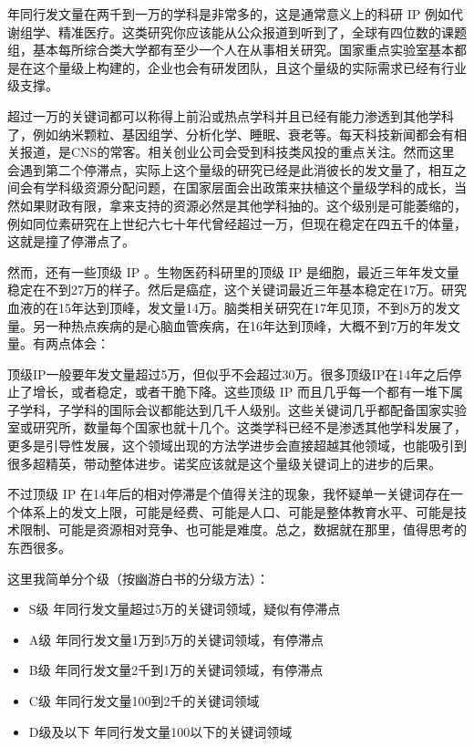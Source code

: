 \documentclass[]{book}
\begin{document}
年同行发文量在两千到一万的学科是非常多的，这是通常意义上的科研 IP 例如代谢组学、精准医疗。这类研究你应该能从公众报道到听到了，全球有四位数的课题组，基本每所综合类大学都有至少一个人在从事相关研究。国家重点实验室基本都是在这个量级上构建的，企业也会有研发团队，且这个量级的实际需求已经有行业级支撑。

超过一万的关键词都可以称得上前沿或热点学科并且已经有能力渗透到其他学科了，例如纳米颗粒、基因组学、分析化学、睡眠、衰老等。每天科技新闻都会有相关报道，是CNS的常客。相关创业公司会受到科技类风投的重点关注。然而这里会遇到第二个停滞点，实际上这个量级的研究已经是此消彼长的发文量了，相互之间会有学科级资源分配问题，在国家层面会出政策来扶植这个量级学科的成长，当然如果财政有限，拿来支持的资源必然是其他学科抽的。这个级别是可能萎缩的，例如同位素研究在上世纪六七十年代曾经超过一万，但现在稳定在四五千的体量，这就是撞了停滞点了。

然而，还有一些顶级 IP 。生物医药科研里的顶级 IP 是细胞，最近三年年发文量稳定在不到27万的样子。然后是癌症，这个关键词最近三年基本稳定在17万。研究血液的在15年达到顶峰，发文量14万。脑类相关研究在17年见顶，不到8万的发文量。另一种热点疾病的是心脑血管疾病，在16年达到顶峰，大概不到7万的年发文量。有两点体会：

顶级IP一般要年发文量超过5万，但似乎不会超过30万。很多顶级IP在14年之后停止了增长，或者稳定，或者干脆下降。这些顶级 IP 而且几乎每一个都有一堆下属子学科，子学科的国际会议都能达到几千人级别。这些关键词几乎都配备国家实验室或研究所，数量每个国家也就十几个。这类学科已经不是渗透其他学科发展了，更多是引导性发展，这个领域出现的方法学进步会直接超越其他领域，也能吸引到很多超精英，带动整体进步。诺奖应该就是这个量级关键词上的进步的后果。

不过顶级 IP 在14年后的相对停滞是个值得关注的现象，我怀疑单一关键词存在一个体系上的发文上限，可能是经费、可能是人口、可能是整体教育水平、可能是技术限制、可能是资源相对竞争、也可能是难度。总之，数据就在那里，值得思考的东西很多。

这里我简单分个级（按幽游白书的分级方法）：

\begin{itemize}
\item
  S级 年同行发文量超过5万的关键词领域，疑似有停滞点
\item
  A级 年同行发文量1万到5万的关键词领域，有停滞点
\item
  B级 年同行发文量2千到1万的关键词领域，有停滞点
\item
  C级 年同行发文量100到2千的关键词领域
\item
  D级及以下 年同行发文量100以下的关键词领域
\end{itemize}
\end{document}
